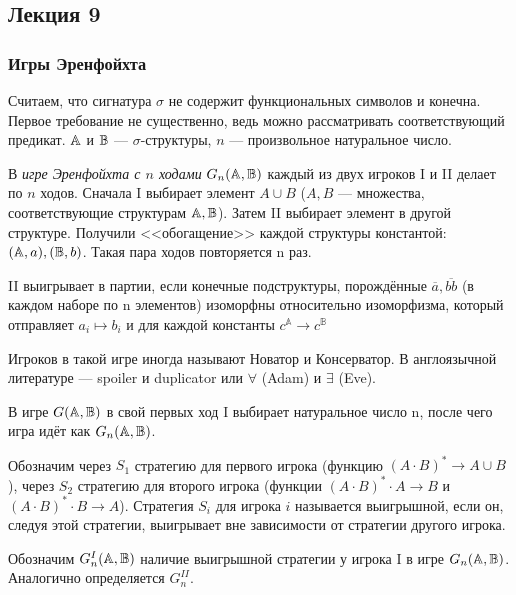 \subsection*{Лекция 9}

\subsubsection{Игры Эренфойхта}

Считаем, что сигнатура $\sigma$ не содержит функциональных символов и конечна. Первое требование не существенно, ведь можно рассматривать соответствующий предикат. ${\mathbb A}$ и ${\mathbb B}$ — $\sigma$-структуры, $n$ — произвольное натуральное число.

\begin{definition}
    В \emph{игре Эренфойхта с $n$ ходами} $G_n({\mathbb A}, {\mathbb B})$ каждый из двух игроков I и II  делает по $n$ ходов. Сначала I выбирает элемент $A\cup B$ ($A, B$ — множества, соответствующие структурам ${\mathbb A}, {\mathbb B}$). Затем II выбирает элемент в другой структуре. Получили <<обогащение>> каждой структуры константой: $({\mathbb A}, a), ({\mathbb B}, b)$. Такая пара ходов повторяется n раз.

    II выигрывает в партии, если конечные подструктуры, порождённые $\overline{a}, \overline{bb}$ (в каждом наборе по n элементов) изоморфны относительно изоморфизма, который отправляет $a_i \mapsto b_i$ и для каждой константы $c^{\mathbb{A}}\to c^{\mathbb{B}}$
\end{definition}

\begin{remark}
    Игроков в такой игре иногда называют Новатор и Консерватор. В англоязычной литературе — spoiler и duplicator или $\forall$ (Adam) и $\exists$ (Eve).
\end{remark}

\begin{definition}
    В игре $G({\mathbb A}, {\mathbb B})$ в свой первых ход I выбирает натуральное число n, после чего игра идёт как $G_n({\mathbb A}, {\mathbb B})$.
\end{definition}

Обозначим через $S_1$ стратегию для первого игрока (функцию $(A\cdot B)^*\to A\cup B$), через $S_2$ стратегию для второго игрока (функции $(A\cdot B)^*\cdot A\to B$ и $(A\cdot B)^*\cdot B\to A$). Стратегия $S_i$ для игрока $i$ называется выигрышной, если он, следуя этой стратегии, выигрывает вне зависимости от стратегии другого игрока.

Обозначим $G_n^I({\mathbb A}, {\mathbb B})$ наличие выигрышной стратегии у игрока I в игре $G_n({\mathbb A}, {\mathbb B})$. Аналогично определяется $G_n^{II}$.

